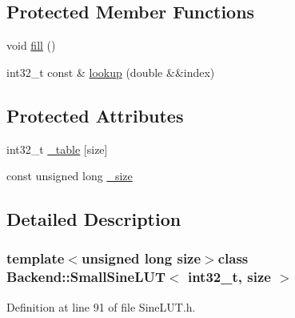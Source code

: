 \subsection*{Protected Member Functions}
\begin{DoxyCompactItemize}
\item 
void \hyperlink{class_backend_1_1_small_sine_l_u_t_3_01int32__t_00_01size_01_4_a0fad3b2c0904d1c2a65c850431f1ac3f}{fill} ()
\item 
int32\+\_\+t const \& \hyperlink{class_backend_1_1_small_sine_l_u_t_3_01int32__t_00_01size_01_4_ab58e1db04772d8fad7b5d0f4936454bd}{lookup} (double \&\&index)
\end{DoxyCompactItemize}
\subsection*{Protected Attributes}
\begin{DoxyCompactItemize}
\item 
int32\+\_\+t \hyperlink{class_backend_1_1_l_u_t_ae70f3f0c9aaa9e0b85517d8e2c61d9a5}{\+\_\+table} \mbox{[}size\mbox{]}
\item 
const unsigned long \hyperlink{class_backend_1_1_l_u_t_a94d2ce1a7c644ce2d4f8e905790b9b54}{\+\_\+size}
\end{DoxyCompactItemize}


\subsection{Detailed Description}
\subsubsection*{template$<$unsigned long size$>$class Backend\+::\+Small\+Sine\+L\+U\+T$<$ int32\+\_\+t, size $>$}



Definition at line 91 of file Sine\+L\+U\+T.\+h.




